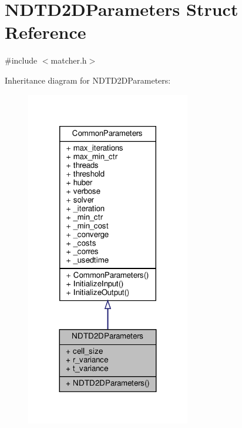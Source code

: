 \hypertarget{structNDTD2DParameters}{}\section{N\+D\+T\+D2\+D\+Parameters Struct Reference}
\label{structNDTD2DParameters}


{\ttfamily \#include $<$matcher.\+h$>$}



Inheritance diagram for N\+D\+T\+D2\+D\+Parameters\+:\nopagebreak
\begin{figure}[H]
\begin{center}
\leavevmode
\includegraphics[width=203pt]{db/d2a/structNDTD2DParameters__inherit__graph}
\end{center}
\end{figure}


